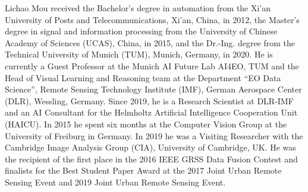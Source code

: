 \documentclass[lettersize,journal]{IEEEtran}
\begin{document}
\begin{IEEEbiographynophoto}{Lichao Mou} received the Bachelor's degree in automation from the Xi'an University of Posts and Telecommunications, Xi'an, China, in 2012, the Master's degree in signal and information processing from the University of Chinese Academy of Sciences (UCAS), China, in 2015, and the Dr.-Ing. degree from the Technical University of Munich (TUM), Munich, Germany, in 2020. He is currently a Guest Professor at the Munich AI Future Lab AI4EO, TUM and the Head of Visual Learning and Reasoning team at the Department ``EO Data Science'', Remote Sensing Technology Institute (IMF), German Aerospace Center (DLR), Wessling, Germany. Since 2019, he is a Research Scientist at DLR-IMF and an AI Consultant for the Helmholtz Artificial Intelligence Cooperation Unit (HAICU). In 2015 he spent six months at the Computer Vision Group at the University of Freiburg in Germany. In 2019 he was a Visiting Researcher with the Cambridge Image Analysis Group (CIA), University of Cambridge, UK. He was the recipient of the first place in the 2016 IEEE GRSS Data Fusion Contest and finalists for the Best Student Paper Award at the 2017 Joint Urban Remote Sensing Event and 2019 Joint Urban Remote Sensing Event.
\end{IEEEbiographynophoto}
\end{document}
